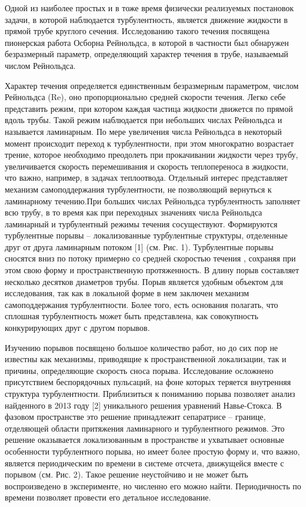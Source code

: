 Одной из наиболее простых и в тоже время физически реализуемых постановок задачи, в которой наблюдается турбулентность, является движение жидкости в прямой трубе круглого сечения. Исследованию такого течения посвящена пионерская работа Осборна Рейнольдса, в которой в частности был обнаружен безразмерный параметр, определяющий характер течения в трубе, называемый числом Рейнольдса. 

Характер течения определяется единственным безразмерным параметром, числом Рейнольдса (Re), оно пропорционально средней скорости течения. Легко себе представить режим, при котором каждая частица жидкости движется по прямой вдоль трубы. Такой режим наблюдается при небольших числах Рейнольдса и называется ламинарным. По мере увеличения числа Рейнольдса в некоторый момент происходит переход к турбулентности, при этом многократно возрастает трение, которое необходимо преодолеть при прокачивании жидкости через трубу, увеличивается скорость перемешивания и скорость теплопереноса в жидкости, что важно, например, в задачах теплоотвода. Отдельный интерес представляет механизм самоподдержания турбулентности, не позволяющий вернуться к ламинарному течению.При больших числах Рейнольдса турбулентность заполняет всю трубу, в то время как при переходных значениях числа Рейнольдса ламинарный и турбулентный режимы течения сосуществуют. Формируются турбулентные порывы -- локализованные турбулентные структуры, отделенные друг от друга ламинарным потоком [1] (см. Рис. 1). Турбулентные порывы сносятся вниз по потоку примерно со средней скоростью течения , сохраняя при этом свою форму и пространственную протяженность. В длину порыв составляет несколько десятков диаметров трубы. Порыв является удобным объектом для исследования, так как в локальной форме в нем заключен механизм самоподдержания турбулентности. Более того, есть основания полагать, что сплошная турбулентность может быть представлена, как совокупность конкурирующих друг с другом порывов.

Изучению порывов посвящено большое количество работ, но до сих пор не известны как механизмы, приводящие к пространственной локализации, так и причины, определяющие скорость сноса порыва. Исследование осложнено присутствием беспорядочных пульсаций, на фоне которых теряется внутренняя структура турбулентности. Приблизиться к пониманию порыва позволяет анализ найденного в 2013 году [2] уникального решения уравнений Навье-Стокса. В фазовом пространстве это решение принадлежит сепаратрисе -- границе, отделяющей области притяжения ламинарного и турбулентного режимов. Это решение оказывается локализованным в пространстве и ухватывает основные особенности турбулентного порыва, но имеет более простую форму и, что важно, является периодическим по времени в системе отсчета, движущейся вместе с порывом (см. Рис. 2). Такое решение неустойчиво и не может быть воспроизведено в эксперименте, но численно его можно найти. Периодичность по времени позволяет провести его детальное исследование. 

